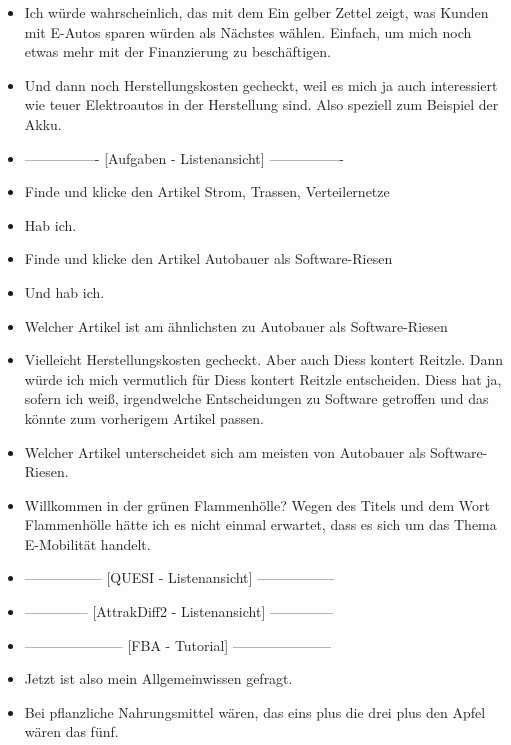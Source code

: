 {\begin{itemize}[]
        \item {} Ich würde wahrscheinlich, das mit dem \flqq Ein gelber Zettel zeigt, was Kunden mit E-Autos sparen würden\frqq{} als Nächstes wählen.
              Einfach, um mich noch etwas mehr mit der Finanzierung zu beschäftigen.
        \item {} Und dann noch \flqq Herstellungskosten\frqq{} gecheckt, weil es mich ja auch interessiert wie teuer Elektroautos in der Herstellung sind.
              Also speziell zum Beispiel der Akku.
        \item {----------------} [Aufgaben - Listenansicht] {----------------}
        \item {} Finde und klicke den Artikel \flqq Strom, Trassen, Verteilernetze\frqq{}
        \item {} Hab ich.
        \item {} Finde und klicke den Artikel \flqq Autobauer als Software-Riesen\frqq{}
        \item {} Und hab ich.
        \item {} Welcher Artikel ist am ähnlichsten zu \flqq Autobauer als Software-Riesen\frqq{}
        \item {} Vielleicht \flqq Herstellungskosten gecheckt\frqq{}.
              Aber auch \flqq Diess kontert Reitzle\frqq{}.
              Dann würde ich mich vermutlich für \flqq Diess kontert Reitzle\frqq{} entscheiden.
              Diess hat ja, sofern ich weiß, irgendwelche Entscheidungen zu Software getroffen und das könnte zum vorherigem Artikel passen.
        \item {} Welcher Artikel unterscheidet sich am meisten von \flqq Autobauer als Software-Riesen\frqq{}.
        \item {} \flqq Willkommen in der grünen Flammenhölle\frqq{}?
              Wegen des Titels und dem Wort Flammenhölle hätte ich es nicht einmal erwartet, dass es sich um das Thema E-Mobilität handelt.
        \item {-----------------} [QUESI - Listenansicht] {-----------------}
        \item {--------------} [AttrakDiff2 - Listenansicht] {--------------}
        \item {---------------------} [FBA - Tutorial] {---------------------}
        \item {} Jetzt ist also mein Allgemeinwissen gefragt.
        \item {} Bei pflanzliche Nahrungsmittel wären, das eins plus die drei plus den Apfel wären das fünf.

\end{itemize}}
